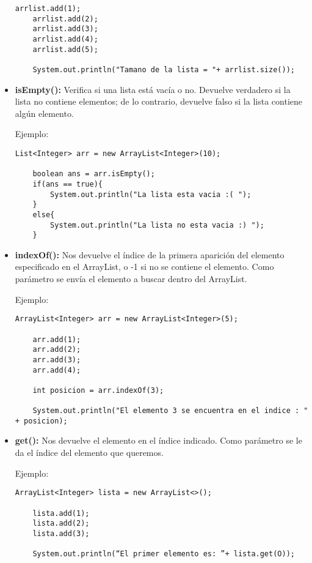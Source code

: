 \documentclass[12pt, letterpaper]{article} %
\begin{document}
\begin{itemize}
\begin{lstlisting}[frame=single]
    arrlist.add(1);
    arrlist.add(2);
    arrlist.add(3);
    arrlist.add(4);
    arrlist.add(5);

    System.out.println("Tamano de la lista = "+ arrlist.size());
    \end{lstlisting}
    
    \item \textbf{isEmpty():} Verifica si una lista está vacía o no. Devuelve verdadero si la lista no contiene elementos; de lo contrario, devuelve falso si la lista contiene algún elemento.
    
    Ejemplo:
    \lstset{language = Java, breaklines=true, basicstyle=\footnotesize}
    \begin{lstlisting}[frame=single]
    List<Integer> arr = new ArrayList<Integer>(10);
    
    boolean ans = arr.isEmpty();
    if(ans == true){
        System.out.println("La lista esta vacia :( ");
    }
    else{
    	System.out.println("La lista no esta vacia :) ");
    }
    \end{lstlisting}

    \item \textbf{indexOf():} Nos devuelve el índice de la primera aparición del elemento especificado en el ArrayList, o -1 si no se contiene el elemento. Como parámetro se envía el elemento a buscar dentro del ArrayList.
    
    Ejemplo:
    \lstset{language = Java, breaklines=true, basicstyle=\footnotesize}
    \begin{lstlisting}[frame=single]
    ArrayList<Integer> arr = new ArrayList<Integer>(5);

    arr.add(1);
    arr.add(2);
    arr.add(3);
    arr.add(4);

    int posicion = arr.indexOf(3);

    System.out.println("El elemento 3 se encuentra en el indice : " + posicion);
    \end{lstlisting}

    \item \textbf{get():} Nos devuelve el elemento en el índice indicado. Como parámetro se le da el índice del elemento que queremos.
    
    Ejemplo:
    \lstset{language = Java, breaklines=true, basicstyle=\footnotesize}
    \begin{lstlisting}[frame=single]
    ArrayList<Integer> lista = new ArrayList<>();

    lista.add(1);
    lista.add(2);
    lista.add(3);

    System.out.println(“El primer elemento es: ”+ lista.get(O));
    \end{lstlisting}
\end{itemize}
\end{document}

